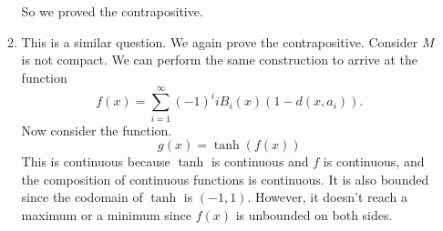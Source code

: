\documentclass{article}
\numberwithin{equation}{section}
\begin{document}
\begin{enumerate}
\begin{enumerate}[label=(\alph*)]
        So we proved the contrapositive.
        \item This is a similar question. We again prove the contrapositive. Consider $M$ is not compact. We can perform the same construction to arrive at the function 
        \begin{equation*}
            f(x) = \sum_{i=1}^{\infty} (-1)^iiB_i(x)(1-d(x,a_i)).
        \end{equation*}
        Now consider the function.
        \begin{equation*}
            g(x) = \tanh(f(x))
        \end{equation*}
        This is continuous because $\tanh$ is continuous and $f$ is continuous, and the composition of continuous functions is continuous. It is also bounded since the codomain of $\tanh$ is $(-1,1).$ However, it doesn't reach a maximum or a minimum since $f(x)$ is unbounded on both sides.
    \end{enumerate}
\end{enumerate}
\end{document}
